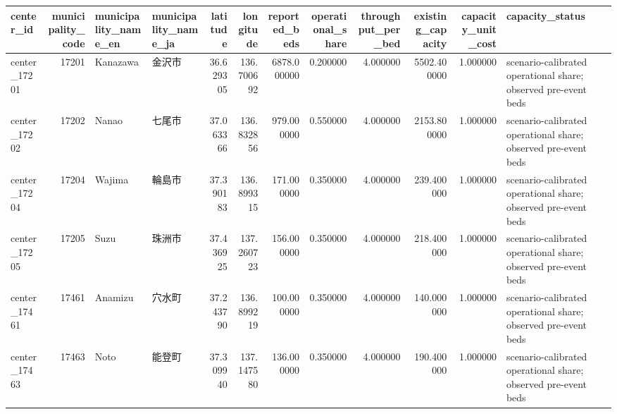 \begin{tabular}{lrllrrrrrrrl}
\toprule
center\_id & municipality\_code & municipality\_name\_en & municipality\_name\_ja & latitude & longitude & reported\_beds & operational\_share & throughput\_per\_bed & existing\_capacity & capacity\_unit\_cost & capacity\_status \\
\midrule
center\_17201 & 17201 & Kanazawa & 金沢市 & 36.629305 & 136.700692 & 6878.000000 & 0.200000 & 4.000000 & 5502.400000 & 1.000000 & scenario-calibrated operational share; observed pre-event beds \\
center\_17202 & 17202 & Nanao & 七尾市 & 37.063366 & 136.832856 & 979.000000 & 0.550000 & 4.000000 & 2153.800000 & 1.000000 & scenario-calibrated operational share; observed pre-event beds \\
center\_17204 & 17204 & Wajima & 輪島市 & 37.390183 & 136.899315 & 171.000000 & 0.350000 & 4.000000 & 239.400000 & 1.000000 & scenario-calibrated operational share; observed pre-event beds \\
center\_17205 & 17205 & Suzu & 珠洲市 & 37.436925 & 137.260723 & 156.000000 & 0.350000 & 4.000000 & 218.400000 & 1.000000 & scenario-calibrated operational share; observed pre-event beds \\
center\_17461 & 17461 & Anamizu & 穴水町 & 37.243790 & 136.899219 & 100.000000 & 0.350000 & 4.000000 & 140.000000 & 1.000000 & scenario-calibrated operational share; observed pre-event beds \\
center\_17463 & 17463 & Noto & 能登町 & 37.309940 & 137.147580 & 136.000000 & 0.350000 & 4.000000 & 190.400000 & 1.000000 & scenario-calibrated operational share; observed pre-event beds \\
\bottomrule
\end{tabular}

